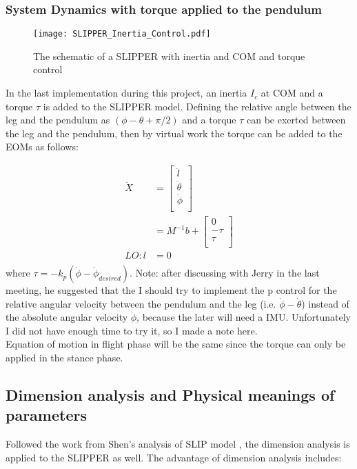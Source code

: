 \subsubsection{System Dynamics with torque applied to the pendulum}
\begin{figure}[h]
	\centering
\texttt{[image: SLIPPER\_Inertia\_Control.pdf]}
\caption{The schematic of a SLIPPER with inertia and COM and torque control}
\label{fig.SLIPPER_Inertia_Control}
\end{figure}
In the last implementation during this project, an inertia $I_c$ at COM and a torque $\tau$ is added to the SLIPPER model.  Defining the relative angle between the leg and the pendulum as $(\phi-\theta+\pi/2)$ and a torque $\tau$ can be exerted between the leg and the pendulum, then by virtual work the torque can be added to the EOMs as follows:

\begin{align}
\label{eq:EOM_SLIPPCtrl}
\nonumber \ddot X &= 
\begin{bmatrix}
\ddot l  \\
\ddot \theta\\
\ddot \phi  \\
\end{bmatrix} \\ &= M^{-1} b +
\begin{bmatrix}
 0  \\
 -\tau\\
 \tau  \\
\end{bmatrix}\\
LO: l&=0\\
\end{align}
where $\tau = -k_p(\dot\phi-\dot{\phi}_{desired})$. Note: after discussing with Jerry in the last meeting, he suggested that the I should try to implement the p control for the relative angular velocity between the pendulum and the leg (i.e. $\dot \phi-\dot \theta$) instead of the absolute angular velocity $\dot\phi$, because the later will need a IMU. Unfortunately I did not have enough time to try it, so I made a note here.\\ 

\noindent Equation of motion in flight phase will be the same since the torque can only be applied in the stance phase.

\subsection{Dimension analysis and Physical meanings of parameters}
Followed the work from Shen's analysis of SLIP model \cite{Shen2016}, the dimension analysis is applied to the SLIPPER as well. The advantage of dimension analysis includes:


